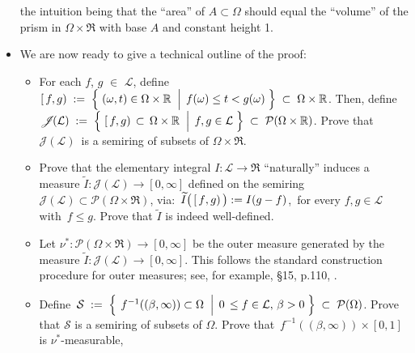 \begin{itemize}
	the intuition being that the ``area'' of $A \subset \Omega$ should equal the
	``volume'' of the prism in $\Omega \times \Re$ with base $A$ and constant height 1.
\item
	We are now ready to give a technical outline of the proof:
	\begin{itemize}
	\item
		For each $f$, $g$ $\in$ $\mathcal{L}$, define
		\,$[\,f,g)
		\; := \;
			\left\{\,
			\left.
			(\omega,t) \overset{{\color{white}.}}{\in} \Omega \times \Re
			\;\;\right\vert\;
			f(\omega) \leq t < g(\omega)
			\;\right\}
		\; \subset \;
		\Omega \times \Re$.
		\vskip 0.05cm
		Then, define
		$\mathscr{J}\!(\mathcal{L})
		\; := \;
			\left\{\,
			\left.
			[\,f,g) \,\overset{{\color{white}.}}{\subset}\, \Omega \times \Re
			\;\;\right\vert\;
			f,g \in \mathcal{L}
			\;\right\}
		\; \subset \;
			\mathcal{P}\!\left(\Omega \times \Re\right)$.
		\vskip 0.05cm
		Prove that \,$\mathscr{J}\!(\mathcal{L})$\, is a semiring of subsets of $\Omega \times \Re$.
	\item
		Prove that the elementary integral $I : \mathcal{L} \longrightarrow \Re$ ``naturally'' induces
		a measure $\widetilde{I} : \mathscr{J}\!(\mathcal{L}) \longrightarrow [0,\infty]$ defined on the semiring
		$\mathscr{J}\!(\mathcal{L}) \subset \mathcal{P}(\Omega\times\Re)$, via:
		\,$\widetilde{I}\!\left(\,[\,f\!\overset{{\color{white}-}}{,}g)\,\right) := I(g-f)$,\,
		for every $f, g \in \mathcal{L}$\, with \,$f \leq g$.
		\vskip 0.05cm
		Prove that $\widetilde{I}$ is indeed well-defined.
	\item
		Let $\nu^{*} : \mathcal{P}(\Omega\times\Re) \longrightarrow [0,\infty]$ be the outer measure
		generated by the measure $\widetilde{I} : \mathscr{J}\!(\mathcal{L}) \longrightarrow [0,\infty]$.
		\vskip 0.05cm
		This follows the standard construction procedure for outer measures;
		see, for example, \S15, p.110, \cite{Aliprantis1998}.
	\item
		Define
		\,$\mathcal{S}
		\; := \;
			\left\{\;\left.
				f^{-1}((\beta,\infty)) \overset{{\color{white}.}}{\subset} \Omega
			\;\;\right\vert\;
				0 \,\leq f \in \mathcal{L},\, \beta > 0
			\;\right\}
		\;\subset\;
			\mathcal{P}(\Omega)$.
		\vskip 0.05cm
		Prove that $\mathcal{S}$ is a semiring of subsets of $\Omega$.
		\vskip 0.05cm
		Prove that \,$f^{-1}((\beta,\infty)) \times [0,1]$\, is $\nu^{*}$-measurable,

\end{itemize}
\end{itemize}
